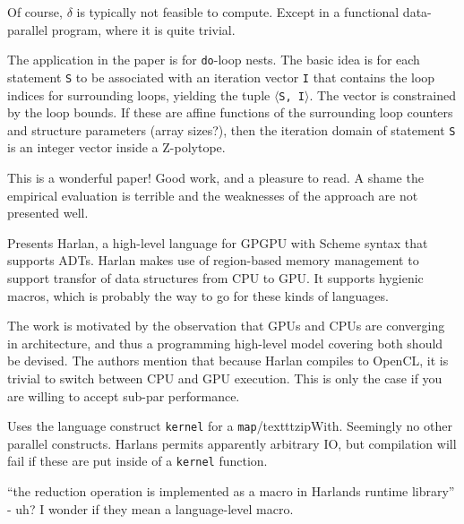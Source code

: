 \documentclass[a4paper, oneside, final]{memoir}
\begin{document}
Of course, $\delta$ is typically not feasible to compute.  Except in a
functional data-parallel program, where it is quite trivial.

The application in the paper is for \texttt{do}-loop nests.  The basic
idea is for each statement \texttt{S} to be associated with an
iteration vector \texttt{I} that contains the loop indices for
surrounding loops, yielding the tuple \texttt{$\langle$S, I$\rangle$}.
The vector is constrained by the loop bounds.  If these are affine
functions of the surrounding loop counters and structure parameters
(array sizes?), then the iteration domain of statement \texttt{S} is
an integer vector inside a Z-polytope.

\begin{quote}
\end{quote}

This is a wonderful paper!  Good work, and a pleasure to read.  A
shame the empirical evaluation is terrible and the weaknesses of the
approach are not presented well.

Presents Harlan, a high-level language for GPGPU with Scheme syntax
that supports ADTs.  Harlan makes use of region-based memory
management to support transfor of data structures from CPU to GPU.  It
supports hygienic macros, which is probably the way to go for these
kinds of languages.

The work is motivated by the observation that GPUs and CPUs are
converging in architecture, and thus a programming high-level model
covering both should be devised.  The authors mention that because
Harlan compiles to OpenCL, it is trivial to switch between CPU and GPU
execution.  This is only the case if you are willing to accept sub-par
performance.

Uses the language construct \texttt{kernel} for a
\texttt{map}/texttt{zipWith}.  Seemingly no other parallel constructs.
Harlans permits apparently arbitrary IO, but compilation will fail if
these are put inside of a \texttt{kernel} function.

``the reduction operation is implemented as a macro in Harlands
runtime library'' - uh?  I wonder if they mean a language-level macro.
\end{document}
